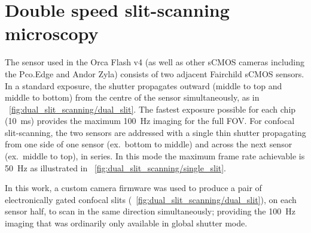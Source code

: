 \section{Double speed \gls{slit-scanning} microscopy}
The sensor used in the Orca Flash v4 (as well as other \gls{sCMOS} cameras including the Pco.Edge and Andor Zyla) consists of two adjacent Fairchild \gls{sCMOS} sensors.
In a standard exposure, the shutter propagates outward (middle to top and middle to bottom) from the centre of the sensor simultaneously, as in \figurename~\ref{fig:dual_slit_scanning/dual_slit}.
The fastest exposure possible for each chip (\SI{10}{\milli\second}) provides the maximum \SI{100}{\hertz} imaging for the full \gls{FOV}.
For confocal \gls{slit-scanning}, the two sensors are addressed with a single thin shutter propagating from one side of one sensor (ex.~bottom to middle) and across the next sensor (ex.~middle to top), in series.
In this mode the maximum frame rate achievable is \SI{50}{\hertz} as illustrated in \figurename~\ref{fig:dual_slit_scanning/single_slit}.

In this work, a custom camera firmware was used to produce a pair of electronically gated confocal slits (\figurename~\ref{fig:dual_slit_scanning/dual_slit}), on each sensor half, to scan in the same direction simultaneously; providing the \SI{100}{\hertz} imaging that was ordinarily only available in global shutter mode.


